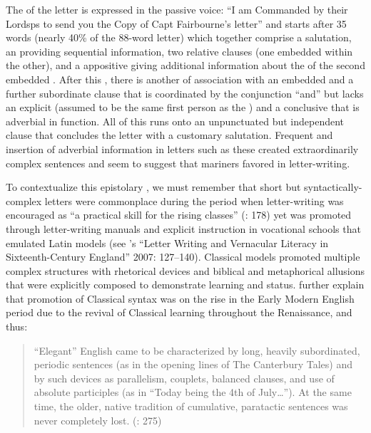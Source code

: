 The  of the letter is expressed in the passive voice: “I am Commanded by their Lordsps to send you the Copy of Capt Fairbourne’s letter” and starts after 35 words (nearly 40\% of the 88-word letter) which together comprise a  salutation, an  providing sequential information, two relative clauses (one embedded within the other), and a  appositive giving additional information about the  of the second embedded . After this , there is another  of association with an embedded  and a further subordinate clause that is coordinated by the conjunction “and” but lacks an explicit  (assumed to be the same first person as the ) and a conclusive  that is adverbial in function. All of this runs onto an unpunctuated but independent clause that concludes the letter with a customary salutation. Frequent  and insertion of adverbial information in letters such as these created extraordinarily complex sentences and seem to suggest that mariners favored  in letter-writing.  

To contextualize this epistolary , we must remember that short but syntactically-complex letters were commonplace during the period when letter-writing was encouraged as “a practical skill for the rising classes”  (\citealt{Mitchell2007}: 178) yet was promoted through letter-writing manuals and explicit instruction in vocational schools that emulated Latin models (see \citeauthor{WebsterNewbold2007}’s “Letter Writing and Vernacular Literacy in Sixteenth-Century England” 2007: 127–140). Classical models promoted multiple complex structures with rhetorical devices and biblical and metaphorical allusions that were explicitly composed to demonstrate learning and status. \citet{MillwardHayes2012} further explain that promotion of Classical syntax was on the rise in the Early Modern English period due to the revival of Classical learning throughout the Renaissance, and thus:

\begin{quotation}
“Elegant” English came to be characterized by long, heavily subordinated, periodic sentences (as in the opening lines of The Canterbury Tales) and by such devices as parallelism, couplets, balanced clauses, and use of absolute participles (as in “Today being the 4th of July…”). At the same time, the older, native tradition of cumulative, paratactic sentences was never completely lost. (\citealt{MillwardHayes2012}: 275)
\end{quotation}

